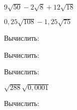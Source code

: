 \begin{class}[number=4]
\begin{listofex}
\begin{enumcols}[itemcolumns=3]
			\item \( 9\sqrt{50}-2\sqrt{8}+12\sqrt{18} \)
			\item \( 0,25\sqrt{108}-1,25\sqrt{75} \)
		\end{enumcols}
		\item Вычислить:
		\begin{enumcols}[itemcolumns=2]
			\item {}
			\item {}
			\item {}
			\item {}
			\item {}
			\item {}
		\end{enumcols}
		\item Вычислить:
		\begin{enumcols}[itemcolumns=2]
			\item {}
			\item {}
			\item {}
			\item {}
		\end{enumcols}
		\item Вычислить:
		\begin{enumcols}[itemcolumns=2]
			\item \( \sqrt{288} \sqrt{0,0001}\)
			\item {}
			\item {}
		\end{enumcols}
		\item Вычислить:
		\begin{enumcols}[itemcolumns=2]
			\item {}
			\item {}
		\end{enumcols}
	\end{listofex}
\end{class}
%
%
%
%
%
